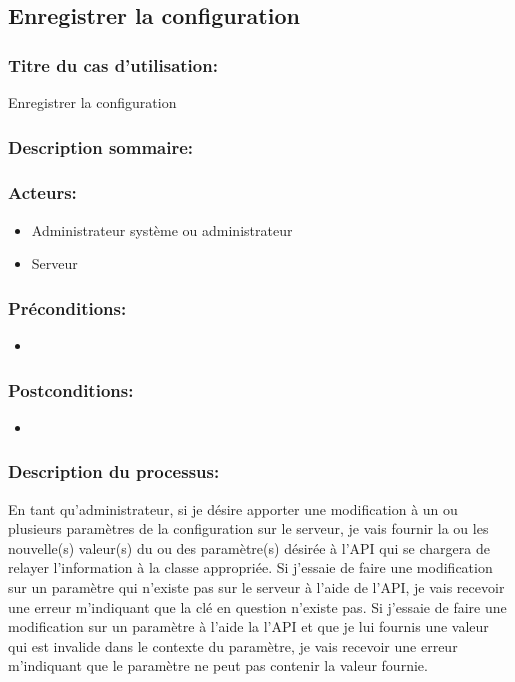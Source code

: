 \documentclass{scrreprt}
\begin{document}
\subsection{Enregistrer la configuration}
\subsubsection{Titre du cas d'utilisation:} Enregistrer la configuration
\subsubsection{Description sommaire:}
\subsubsection{Acteurs:}
\begin{itemize}
	\item Administrateur système ou administrateur
    \item Serveur
\end{itemize}
\subsubsection{Préconditions:}
\begin{itemize}
    \item  
\end{itemize} 
\subsubsection{Postconditions:}
\begin{itemize}
    \item  
\end{itemize} 
\subsubsection{Description du processus:}En tant qu'administrateur, si je désire apporter une modification à un ou plusieurs
paramètres de la configuration sur le serveur, je vais fournir la ou les nouvelle(s) valeur(s)
du ou des paramètre(s) désirée à l'API qui se chargera de relayer l'information à la classe appropriée.
Si j'essaie de faire une modification sur un paramètre qui n'existe pas sur le
serveur à l'aide de l'API, je vais recevoir une erreur m'indiquant que la clé en
question n'existe pas.
Si j'essaie de faire une modification sur un paramètre à l'aide la l'API et que
je lui fournis une valeur qui est invalide dans le contexte du paramètre, je
vais recevoir une erreur m'indiquant que le paramètre ne peut pas contenir
la valeur fournie.
\end{document}
